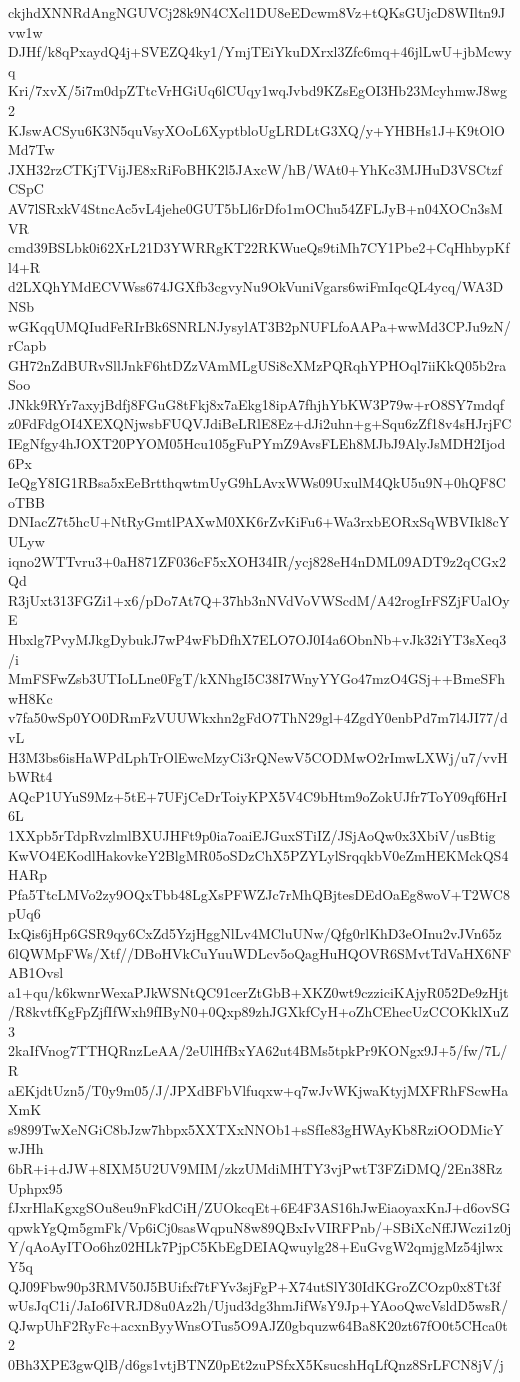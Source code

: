 ckjhdXNNRdAngNGUVCj28k9N4CXcl1DU8eEDcwm8Vz+tQKsGUjcD8WIltn9Jvw1w
DJHf/k8qPxaydQ4j+SVEZQ4ky1/YmjTEiYkuDXrxl3Zfc6mq+46jlLwU+jbMcwyq
Kri/7xvX/5i7m0dpZTtcVrHGiUq6lCUqy1wqJvbd9KZsEgOI3Hb23McyhmwJ8wg2
KJswACSyu6K3N5quVsyXOoL6XyptbloUgLRDLtG3XQ/y+YHBHs1J+K9tOlOMd7Tw
JXH32rzCTKjTVijJE8xRiFoBHK2l5JAxcW/hB/WAt0+YhKc3MJHuD3VSCtzfCSpC
AV7lSRxkV4StncAc5vL4jehe0GUT5bLl6rDfo1mOChu54ZFLJyB+n04XOCn3sMVR
cmd39BSLbk0i62XrL21D3YWRRgKT22RKWueQs9tiMh7CY1Pbe2+CqHhbypKfl4+R
d2LXQhYMdECVWss674JGXfb3cgvyNu9OkVuniVgars6wiFmIqcQL4ycq/WA3DNSb
wGKqqUMQIudFeRIrBk6SNRLNJysylAT3B2pNUFLfoAAPa+wwMd3CPJu9zN/rCapb
GH72nZdBURvSllJnkF6htDZzVAmMLgUSi8cXMzPQRqhYPHOql7iiKkQ05b2raSoo
JNkk9RYr7axyjBdfj8FGuG8tFkj8x7aEkg18ipA7fhjhYbKW3P79w+rO8SY7mdqf
z0FdFdgOI4XEXQNjwsbFUQVJdiBeLRlE8Ez+dJi2uhn+g+Squ6zZf18v4sHJrjFC
IEgNfgy4hJOXT20PYOM05Hcu105gFuPYmZ9AvsFLEh8MJbJ9AlyJsMDH2Ijod6Px
IeQgY8IG1RBsa5xEeBrtthqwtmUyG9hLAvxWWs09UxulM4QkU5u9N+0hQF8CoTBB
DNIacZ7t5hcU+NtRyGmtlPAXwM0XK6rZvKiFu6+Wa3rxbEORxSqWBVIkl8cYULyw
iqno2WTTvru3+0aH871ZF036cF5xXOH34IR/ycj828eH4nDML09ADT9z2qCGx2Qd
R3jUxt313FGZi1+x6/pDo7At7Q+37hb3nNVdVoVWScdM/A42rogIrFSZjFUalOyE
Hbxlg7PvyMJkgDybukJ7wP4wFbDfhX7ELO7OJ0I4a6ObnNb+vJk32iYT3sXeq3/i
MmFSFwZsb3UTIoLLne0FgT/kXNhgI5C38I7WnyYYGo47mzO4GSj++BmeSFhwH8Kc
v7fa50wSp0YO0DRmFzVUUWkxhn2gFdO7ThN29gl+4ZgdY0enbPd7m7l4JI77/dvL
H3M3bs6isHaWPdLphTrOlEwcMzyCi3rQNewV5CODMwO2rImwLXWj/u7/vvHbWRt4
AQcP1UYuS9Mz+5tE+7UFjCeDrToiyKPX5V4C9bHtm9oZokUJfr7ToY09qf6HrI6L
1XXpb5rTdpRvzlmlBXUJHFt9p0ia7oaiEJGuxSTiIZ/JSjAoQw0x3XbiV/usBtig
KwVO4EKodlHakovkeY2BlgMR05oSDzChX5PZYLylSrqqkbV0eZmHEKMckQS4HARp
Pfa5TtcLMVo2zy9OQxTbb48LgXsPFWZJc7rMhQBjtesDEdOaEg8woV+T2WC8pUq6
IxQis6jHp6GSR9qy6CxZd5YzjHggNlLv4MCluUNw/Qfg0rlKhD3eOInu2vJVn65z
6lQWMpFWs/Xtf//DBoHVkCuYuuWDLcv5oQagHuHQOVR6SMvtTdVaHX6NFAB1Ovsl
a1+qu/k6kwnrWexaPJkWSNtQC91cerZtGbB+XKZ0wt9czziciKAjyR052De9zHjt
/R8kvtfKgFpZjfIfWxh9fIByN0+0Qxp89zhJGXkfCyH+oZhCEhecUzCCOKklXuZ3
2kaIfVnog7TTHQRnzLeAA/2eUlHfBxYA62ut4BMs5tpkPr9KONgx9J+5/fw/7L/R
aEKjdtUzn5/T0y9m05/J/JPXdBFbVlfuqxw+q7wJvWKjwaKtyjMXFRhFScwHaXmK
s9899TwXeNGiC8bJzw7hbpx5XXTXxNNOb1+sSfIe83gHWAyKb8RziOODMicYwJHh
6bR+i+dJW+8IXM5U2UV9MIM/zkzUMdiMHTY3vjPwtT3FZiDMQ/2En38RzUphpx95
fJxrHlaKgxgSOu8eu9nFkdCiH/ZUOkcqEt+6E4F3AS16hJwEiaoyaxKnJ+d6ovSG
qpwkYgQm5gmFk/Vp6iCj0sasWqpuN8w89QBxIvVIRFPnb/+SBiXcNffJWczi1z0j
Y/qAoAyITOo6hz02HLk7PjpC5KbEgDEIAQwuylg28+EuGvgW2qmjgMz54jlwxY5q
QJ09Fbw90p3RMV50J5BUifxf7tFYv3sjFgP+X74utSlY30IdKGroZCOzp0x8Tt3f
wUsJqC1i/JaIo6IVRJD8u0Az2h/Ujud3dg3hmJifWsY9Jp+YAooQwcVsldD5wsR/
QJwpUhF2RyFc+acxnByyWnsOTus5O9AJZ0gbquzw64Ba8K20zt67fO0t5CHca0t2
0Bh3XPE3gwQlB/d6gs1vtjBTNZ0pEt2zuPSfxX5KsucshHqLfQnz8SrLFCN8jV/j
